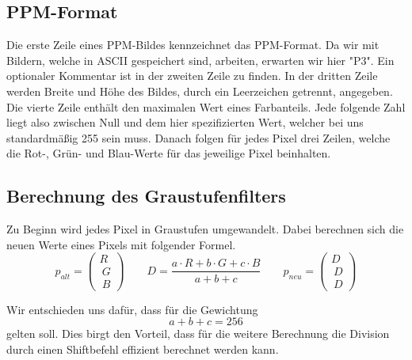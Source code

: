 \documentclass[course=erap]{aspdoc}
\begin{document}
	\subsection{PPM-Format}
	Die erste Zeile eines PPM-Bildes kennzeichnet das PPM-Format. Da wir mit Bildern, welche in ASCII gespeichert sind, arbeiten, erwarten wir hier "P3".
	Ein optionaler Kommentar ist in der zweiten Zeile zu finden.
	In der dritten Zeile werden Breite und Höhe des Bildes, durch ein Leerzeichen getrennt, angegeben.
    Die vierte Zeile enthält den maximalen Wert eines Farbanteils. Jede folgende Zahl liegt also zwischen Null und dem hier spezifizierten Wert, welcher bei uns standardmäßig 255 sein muss.
    Danach folgen für jedes Pixel drei Zeilen, welche die Rot-, Grün- und Blau-Werte für das jeweilige Pixel beinhalten.

	\subsection{Berechnung des Graustufenfilters}
	Zu Beginn wird jedes Pixel in Graustufen umgewandelt. Dabei berechnen sich die neuen Werte eines Pixels mit folgender Formel.
	\begin{equation}
	\label{(1)}
	p_{alt} =  \begin{pmatrix}R \\\ G \\\ B \end{pmatrix} \qquad D = \frac{a \cdot R  + b \cdot G  + c \cdot B }{a + b + c} \qquad p_{neu} =  \begin{pmatrix}D \\\ D \\\ D \end{pmatrix}
	\end{equation}

	Wir entschieden uns dafür, dass für die Gewichtung \begin{equation}
	a + b + c = 256
	\end{equation} gelten soll. Dies birgt den Vorteil, dass für die weitere Berechnung die Division durch einen Shiftbefehl effizient berechnet werden kann.
\end{document}
